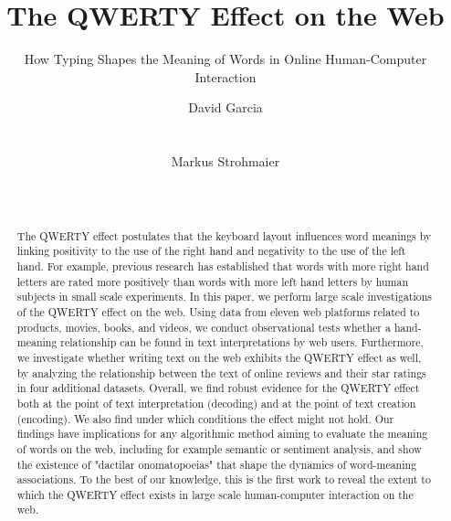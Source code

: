 \documentclass[letterpaper]{sig-alternate-2013}
\begin{document}
\title{The QWERTY Effect on the Web}
\subtitle{How Typing Shapes the Meaning of Words in Online Human-Computer Interaction}

\author{
\alignauthor
        David Garcia\\
       \\
       \\
\alignauthor
        Markus Strohmaier\\
       \\
       \\
}
\maketitle
\begin{abstract}

The QWERTY effect postulates that the keyboard layout influences word meanings
by linking positivity to the use of the right hand and negativity to the use
of the left hand. For example, previous research has established that words
with more right hand letters are rated more positively than words with more
left hand letters by human subjects in small scale experiments. In this paper,
we perform large scale investigations of the QWERTY effect on the web. Using
data from eleven web platforms related to products, movies, books, and videos,
we conduct observational tests whether a hand-meaning relationship can be
found in text interpretations by web users. Furthermore, we
investigate whether writing text on the web exhibits the QWERTY
effect as well, by analyzing the relationship between the text of online
reviews and their star ratings in four additional datasets. Overall, we find
robust evidence for the QWERTY effect both at the point of text interpretation
(decoding) and at the point of text creation (encoding). We also find under
which conditions the effect might not hold. Our findings have implications for
any algorithmic method aiming to evaluate the meaning of words on the web,
including for example semantic or sentiment analysis, and show the existence
of "dactilar onomatopoeias" that shape the dynamics of word-meaning
associations. To the best of our knowledge, this is the first work to reveal
the extent to which the QWERTY effect exists in large scale human-computer
interaction on the web.

\end{abstract}
\end{document}
